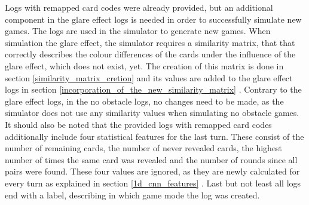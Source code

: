 

Logs with remapped card codes were already provided, but an additional component in the glare effect logs is needed in order to successfully simulate new games. The logs are used in the simulator to generate new games. When simulation the glare effect, the simulator requires a similarity matrix, that that correctly describes the colour differences of the cards under the influence of the glare effect, which does not exist, yet. The creation of this matrix is done in section \ref{similarity_matrix_cretion}  and its values are added to the glare effect logs in section \ref{incorporation_of_the_new_similarity_matrix} . Contrary to the glare effect logs, in the no obstacle logs, no changes need to be made, as the simulator does not use any similarity values when simulating no obstacle games. It should also be noted that the provided logs with remapped card codes additionally include four statistical features for the last turn. These consist of the number of remaining cards, the number of never revealed cards, the highest number of times the same card was revealed and the number of rounds since all pairs were found. These four values are ignored, as they are newly calculated for every turn as explained in section \ref{1d_cnn_features} . Last but not least all logs end with a label, describing in which game mode the log was created. 

